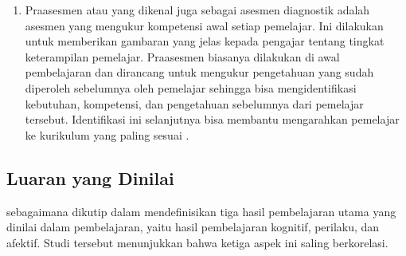 \begin{enumerate}
    \item Praasesmen atau yang dikenal juga sebagai asesmen diagnostik adalah asesmen yang mengukur kompetensi awal setiap pemelajar. Ini dilakukan untuk memberikan gambaran yang jelas kepada
    pengajar tentang tingkat keterampilan pemelajar. Praasesmen biasanya dilakukan di awal pembelajaran dan dirancang
    untuk mengukur pengetahuan yang sudah diperoleh sebelumnya oleh pemelajar sehingga bisa
    mengidentifikasi kebutuhan, kompetensi, dan pengetahuan sebelumnya
    dari pemelajar tersebut. Identifikasi ini selanjutnya bisa membantu mengarahkan pemelajar ke kurikulum yang paling sesuai
    \autocite{Ihichr2024}.
\end{enumerate}

\subsection{Luaran yang Dinilai}
\textcite{Wei2021} sebagaimana dikutip dalam \textcite{Ihichr2024} mendefinisikan tiga hasil pembelajaran utama yang dinilai
dalam pembelajaran, yaitu hasil pembelajaran kognitif, perilaku, dan afektif.
Studi tersebut menunjukkan bahwa ketiga aspek ini saling berkorelasi.

